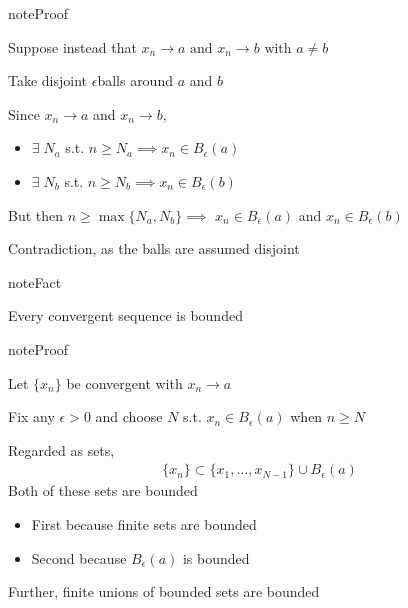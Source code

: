 \documentclass[letterpaper,10pt,english]{jupyterBook}
\begin{document}
\begin{sphinxadmonition}{note}{Proof}

\sphinxAtStartPar
Suppose instead that \(x_n \to a \text{ and } x_n \to b \text{ with } a \ne b \)

\sphinxAtStartPar
Take disjoint \(\epsilon\)\sphinxhyphen{}balls around \(a\) and \(b\)

\begin{figure}[H]
\centering

\noindent{}
\end{figure}

\sphinxAtStartPar
Since \(x_n \to a\) and \(x_n \to b\),
\begin{itemize}
\item {} 
\sphinxAtStartPar
\(\exists \; N_a\) s.t. \(n \geq N_a \implies x_n \in B_{\epsilon}(a)\)

\item {} 
\sphinxAtStartPar
\(\exists \; N_b\) s.t. \(n \geq N_b \implies x_n \in B_{\epsilon}(b)\)

\end{itemize}

\sphinxAtStartPar
But then \(n \geq \max\{N_a, N_b\} \implies \) \(x_n \in B_{\epsilon}(a)\) and \(x_n \in B_{\epsilon}(b)\)

\sphinxAtStartPar
Contradiction, as the balls are assumed disjoint
\end{sphinxadmonition}

\begin{sphinxadmonition}{note}{Fact}

\sphinxAtStartPar
Every convergent sequence is bounded
\end{sphinxadmonition}

\begin{sphinxadmonition}{note}{Proof}

\sphinxAtStartPar
Let \(\{x_n\}\) be convergent with \(x_n \to a\)

\sphinxAtStartPar
Fix any \(\epsilon > 0\) and choose \(N\) s.t. \(x_n \in B_{\epsilon}(a)\) when
\(n \geq N\)

\sphinxAtStartPar
Regarded as sets,
\begin{equation*}
\begin{split}
\{x_n\} \subset \{x_1, \ldots, x_{N-1}\} \cup B_{\epsilon}(a)
\end{split}
\end{equation*}
\sphinxAtStartPar
Both of these sets are bounded
\begin{itemize}
\item {} 
\sphinxAtStartPar
First because finite sets are bounded

\item {} 
\sphinxAtStartPar
Second because \(B_{\epsilon}(a)\) is bounded

\end{itemize}

\sphinxAtStartPar
Further, finite unions of bounded sets are bounded
\end{sphinxadmonition}
\end{document}
